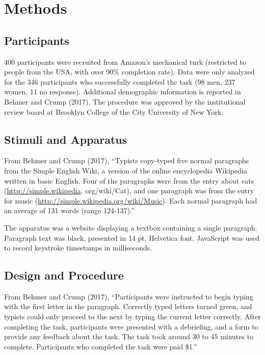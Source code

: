 \documentclass[,man,floatsintext]{apa6}
\begin{document}
\hypertarget{methods}{%
\section{Methods}\label{methods}}

\hypertarget{participants}{%
\subsection{Participants}\label{participants}}

400 participants were recruited from Amazon's mechanical turk (restricted to people from the USA, with over 90\% completion rate). Data were only analyzed for the 346 participants who successfully completed the task (98 men, 237 women, 11 no response). Additional demographic information is reported in Behmer and Crump (2017). The procedure was approved by the institutional review board at Brooklyn College of the City University of New York.

\hypertarget{stimuli-and-apparatus}{%
\subsection{Stimuli and Apparatus}\label{stimuli-and-apparatus}}

From Behmer and Crump (2017), \enquote{Typists copy-typed five normal paragraphs from the Simple English Wiki, a version of the online encyclopedia Wikipedia written in basic English. Four of the paragraphs were from the entry about cats (\url{http://simple.wikipedia}. org/wiki/Cat), and one paragraph was from the entry for music (\url{http://simple.wikipedia.org/wiki/Music}). Each normal paragraph had an average of 131 words (range 124-137).}

The apparatus was a website displaying a textbox containing a single paragraph. Paragraph text was black, presented in 14 pt, Helvetica font. JavaScript was used to record keystroke timestamps in milliseconds.

\hypertarget{design-and-procedure}{%
\subsection{Design and Procedure}\label{design-and-procedure}}

From Behmer and Crump (2017), \enquote{Participants were instructed to begin typing with the first letter in the paragraph. Correctly typed letters turned green, and typists could only proceed to the next by typing the current letter correctly. After completing the task, participants were presented with a debriefing, and a form to provide any feedback about the task. The task took around 30 to 45 minutes to complete. Participants who completed the task were paid \$1.}
\end{document}
